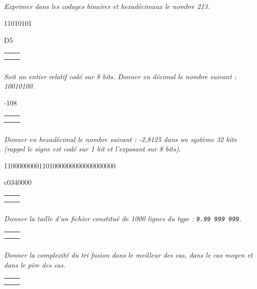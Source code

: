 \documentclass[10pt,fleqn]{article} %
\begin{document}

\vspace{2cm}
\pagestyle{fancy}
\thispagestyle{plain}

\subparagraph{}
\textit{Exprimer dans les codages binaires et hexadécimaux le nombre 213.}

\ifprof
\begin{corrige}
11010101

D5
\end{corrige}
\else
\noindent\begin{tabular}{|p{\linewidth}|}
\hline
$$ \quad $$ \\
$$ \quad $$ \\
\hline
\end{tabular}
\fi
\subparagraph{}
\textit{Soit un entier relatif codé sur 8 bits. Donner en décimal le nombre suivant : 10010100.}

\ifprof
\begin{corrige}
-108
\end{corrige}
\else
\noindent\begin{tabular}{|p{\linewidth}|}
\hline
$$ \quad $$ \\
$$ \quad $$ \\
\hline
\end{tabular}
\fi

\subparagraph{}
\textit{Donner en hexadécimal le nombre suivant : -2,8125 dans un système 32 bits (rappel le signe est codé sur 1 bit et l'exposant sur 8 bits).}

\ifprof
\begin{corrige}
11000000001101000000000000000000

c0340000
\end{corrige}
\else
\noindent\begin{tabular}{|p{\linewidth}|}
\hline
$$ \quad $$ \\
$$ \quad $$ \\
\hline
\end{tabular}
\fi


\subparagraph{}
\textit{Donner la taille d'un fichier constitué de 1000 lignes du type : \texttt{9.99 999 999}.}

\ifprof
\begin{corrige}

\end{corrige}
\else
\noindent\begin{tabular}{|p{\linewidth}|}
\hline
$$ \quad $$ \\
$$ \quad $$ \\
\hline
\end{tabular}
\fi

\subparagraph{}
\textit{Donner la complexité du tri fusion dans le meilleur des cas, dans le cas moyen et dans le pire des cas.}
\ifprof
\begin{corrige}

\end{corrige}
\else
\noindent\begin{tabular}{|p{\linewidth}|}
\hline
$$ \quad $$ \\
$$ \quad $$ \\
\hline
\end{tabular}
\fi
\end{document}
